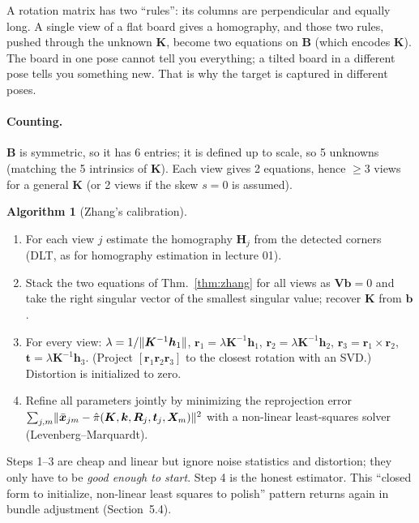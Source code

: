 \documentclass[11pt,a4paper]{article}
\newcommand{\xb}{\bar{\bm{x}}}
\theoremstyle{definition}
\newtheorem{algorithm}{Algorithm}[section]
\theoremstyle{plain}
\theoremstyle{remark}
\begin{document}
\begin{intuition}
A rotation matrix has two ``rules'': its columns are perpendicular and equally long. A single view of a
flat board gives a homography, and those two rules, pushed through the unknown $\bm K$, become two
equations on $\bm B$ (which encodes $\bm K$). The board in one pose cannot tell you everything; a tilted
board in a different pose tells you something new. That is why the target is captured in different poses.
\end{intuition}

\paragraph{Counting.} $\bm B$ is symmetric, so it has 6 entries; it is defined up to scale, so 5 unknowns
(matching the 5 intrinsics of $\bm K$). Each view gives 2 equations, hence $\ge 3$ views for a general $\bm K$ (or 2 views
if the skew $s=0$ is assumed).

\begin{algorithm}[Zhang's calibration]\label{alg:zhangalg}
\begin{enumerate}[nosep]
\item For each view $j$ estimate the homography $\bm H_j$ from the detected corners (DLT, as for homography
 estimation in lecture 01).
\item Stack the two equations of Thm.~\ref{thm:zhang} for all views as $\bm V\bm b=0$ and take the right singular
 vector of the smallest singular value; recover $\bm K$ from $\bm b$.
\item For every view: $\lambda=1/\lVert \bm K^{-1}\bm h_1\rVert$, $\bm r_1=\lambda\bm K^{-1}\bm h_1$,
 $\bm r_2=\lambda\bm K^{-1}\bm h_2$, $\bm r_3=\bm r_1\times\bm r_2$, $\bm t=\lambda\bm K^{-1}\bm h_3$.
 (Project $[\bm r_1\bm r_2\bm r_3]$ to the closest rotation with an SVD.) Distortion is initialized to zero.
\item Refine all parameters jointly by minimizing the reprojection error
 $\sum_{j,m}\norm{\xb_{jm}-\hat\pi(\bm K,\bm k,\bm R_j,\bm t_j,\bm X_m)}^2$ with a non-linear least-squares solver
 (Levenberg--Marquardt).
\end{enumerate}
\end{algorithm}

\begin{intuition}
Steps 1--3 are cheap and linear but ignore noise statistics and distortion; they only have to be
\emph{good enough to start}. Step 4 is the honest estimator. This ``closed form to initialize, non-linear
least squares to polish'' pattern returns again in bundle adjustment (Section~5.4).
\end{intuition}
\end{document}
